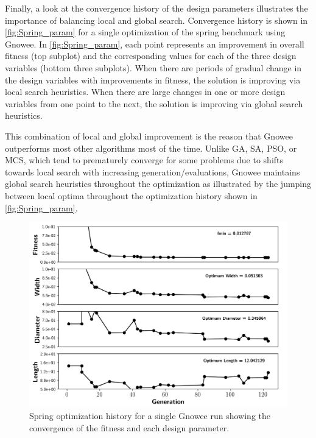 \documentclass{article}                                                                           %
\begin{document}
Finally, a look at the convergence history of the design parameters illustrates the importance of balancing local and global search. 
Convergence history is shown in \autoref{fig:Spring_param} for a single optimization of the spring benchmark using Gnowee.  
In \autoref{fig:Spring_param}, each point represents an improvement in overall fitness (top subplot) and the corresponding values for each of the three design variables (bottom three subplots).  
When there are periods of gradual change in the design variables with improvements in fitness, the solution is improving via local search heuristics.
When there are large changes in one or more design variables from one point to the next, the solution is improving via global search heuristics.  

This combination of local and global improvement is the reason that Gnowee outperforms most other algorithms most of the time. 
Unlike GA, SA, PSO, or MCS, which tend to prematurely converge for some problems due to shifts towards local search with increasing generation/evaluations, Gnowee maintains global search heuristics throughout the optimization as illustrated by the jumping between local optima throughout the optimization history shown in \autoref{fig:Spring_param}. 

\begin{figure}[!t]
  \centering
  \includegraphics[width=4.5in]{Gnowee_Spring}
  \caption{Spring optimization history for a single Gnowee run showing the convergence of the fitness and each design parameter.}
  \label{fig:Spring_param}
\end{figure}
 
\end{document}
